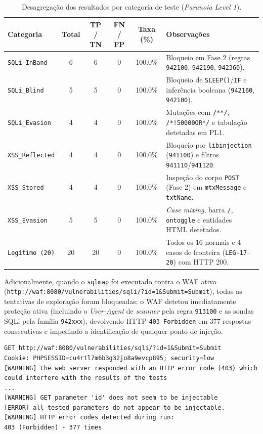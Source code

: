 \documentclass[11pt,a4paper]{article}
\begin{document}
\begin{table}[h!]
\centering
\caption{Desagregação dos resultados por categoria de teste (\textit{Paranoia Level 1}).}
\label{tab:resultados_categoria}
\begin{tabularx}{\textwidth}{l c c c c X}
\toprule
\textbf{Categoria} & \textbf{Total} & \textbf{TP / TN} & \textbf{FN / FP} & \textbf{Taxa (\%)} & \textbf{Observações} \\
\midrule
\texttt{SQLi\_InBand} & 6 & 6 & 0 & 100.0\% & Bloqueio em Fase 2 (regras \texttt{942100}, \texttt{942190}, \texttt{942360}). \\
\texttt{SQLi\_Blind} & 5 & 5 & 0 & 100.0\% & Bloqueio de \texttt{SLEEP()}/\texttt{IF} e inferência booleana (\texttt{942160}, \texttt{942100}). \\
\texttt{SQLi\_Evasion} & 4 & 4 & 0 & 100.0\% & Mutações com \texttt{/**/}, \texttt{/*!50000OR*/} e tabulação detetadas em PL1. \\
\texttt{XSS\_Reflected} & 4 & 4 & 0 & 100.0\% & Bloqueio por \texttt{libinjection} (\texttt{941100}) e filtros \texttt{941110}/\texttt{941120}. \\
\texttt{XSS\_Stored} & 4 & 4 & 0 & 100.0\% & Inspeção do corpo \texttt{POST} (Fase 2) em \texttt{mtxMessage} e \texttt{txtName}. \\
\texttt{XSS\_Evasion} & 5 & 5 & 0 & 100.0\% & \textit{Case mixing}, barra \texttt{/}, \texttt{ontoggle} e entidades HTML detetados. \\
\texttt{Legítimo (20)} & 20 & 20 & 0 & 100.0\% & Todos os 16 normais e 4 casos de fronteira (\texttt{LEG-17}--\texttt{20}) com HTTP 200. \\
\bottomrule
\end{tabularx}
\end{table}

Adicionalmente, quando o \texttt{sqlmap} foi executado contra o WAF ativo (\texttt{http://waf:8080/\allowbreak vulnerabilities/\allowbreak sqli/?\allowbreak id=1\&\allowbreak Submit=Submit}), todas as tentativas de exploração foram bloqueadas: o WAF detetou imediatamente proteção ativa (incluindo o \textit{User-Agent} de \textit{scanner} pela regra \texttt{913100} e as sondas SQLi pela família \texttt{942xxx}), devolvendo HTTP \texttt{403 Forbidden} em 377 respostas consecutivas e impedindo a identificação de qualquer ponto de injeção.

\begin{lstlisting}[caption={Excerto da execução do \texttt{sqlmap} contra o WAF (\texttt{waf:8080}), evidenciando bloqueio massivo com HTTP 403.},label={lst:sqlmap_waf}]
GET http://waf:8080/vulnerabilities/sqli/?id=1&Submit=Submit
Cookie: PHPSESSID=cu4rtl7m6b3g32jo8a9evcp895; security=low
[WARNING] the web server responded with an HTTP error code (403) which could interfere with the results of the tests
...
[WARNING] GET parameter 'id' does not seem to be injectable
[ERROR] all tested parameters do not appear to be injectable.
[WARNING] HTTP error codes detected during run:
403 (Forbidden) - 377 times
\end{lstlisting}
\end{document}
